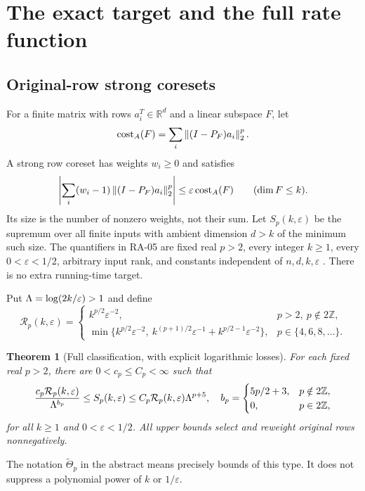 \documentclass[11pt]{article}
\newtheorem{theorem}{Theorem}[section]
\theoremstyle{remark}\newtheorem{remark}[theorem]{Remark}
\newcommand{\R}{\mathbb R}\newcommand{\E}{\mathbb E}\newcommand{\Prob}{\mathbb P}
\newcommand{\eps}{\varepsilon}\newcommand{\norm}[1]{\left\|#1\right\|}
\begin{document}
\section{The exact target and the full rate function}
\subsection{Original-row strong coresets}
For a finite matrix with rows $a_i^T\in\R^d$ and a linear subspace $F$, let
\[
 \cost_A(F)=\sum_i\norm{(I-P_F)a_i}_2^p.
\]
A strong row coreset has weights $w_i\ge0$ and satisfies
\begin{equation}\label{eq:strong}
 \left|\sum_i(w_i-1)\norm{(I-P_F)a_i}_2^p\right|
 \le\eps\cost_A(F)\qquad(\dim F\le k).
\end{equation}
Its size is the number of nonzero weights, not their sum. Let $S_p(k,\eps)$ be the supremum over all finite inputs with ambient dimension $d>k$ of the minimum such size. The quantifiers in RA-05 are fixed real $p>2$, every integer $k\ge1$, every $0<\eps<1/2$, arbitrary input rank, and constants independent of $n,d,k,\eps$ \cite{ra05}. There is no extra running-time target.

Put $\Lam=\log(2k/\eps)>1$ and define
\begin{equation}\label{eq:rate}
 \mathcal R_p(k,\eps)=
 \begin{cases}
 k^{p/2}\eps^{-2},&p>2,\ p\notin2\mathbb Z,\\
 \min\{k^{p/2}\eps^{-2},\ k^{(p+1)/2}\eps^{-1}
                  +k^{p/2-1}\eps^{-2}\},&p\in\{4,6,8,\ldots\}.
 \end{cases}
\end{equation}
\begin{theorem}[Full classification, with explicit logarithmic losses]\label{thm:full}
For each fixed real $p>2$, there are $0<c_p\le C_p<\infty$ such that
\begin{equation}\label{eq:full}
 \frac{c_p\mathcal R_p(k,\eps)}{\Lam^{b_p}}
 \le S_p(k,\eps)\le C_p\mathcal R_p(k,\eps)\Lam^{p+5},
 \quad
 b_p=\begin{cases}5p/2+3,&p\notin2\mathbb Z,\\0,&p\in2\mathbb Z,\end{cases}
\end{equation}
for all $k\ge1$ and $0<\eps<1/2$. All upper bounds select and reweight original rows nonnegatively.
\end{theorem}
The notation $\widetilde\Theta_p$ in the abstract means precisely bounds of this type. It does not suppress a polynomial power of $k$ or $1/\eps$.
\end{document}
